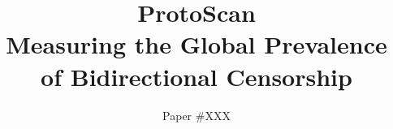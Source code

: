 \documentclass[letterpaper,twocolumn,10pt]{article}
\begin{document}
\pagestyle{plain} %


\renewcommand{\sectionautorefname}{\S}
\renewcommand{\subsectionautorefname}{\S}
\renewcommand{\subsubsectionautorefname}{\S}
\date{}

\setlength{\droptitle}{-5em}   %
\posttitle{\par\end{center}}   %
\title{{\bf ProtoScan}\\\Large{Measuring the Global Prevalence of Bidirectional Censorship}}
\author{Paper \#XXX}


\maketitle

\begin{abstract}
 
\end{abstract}









% 

% 

% 





\newpage



% 
\end{document}
